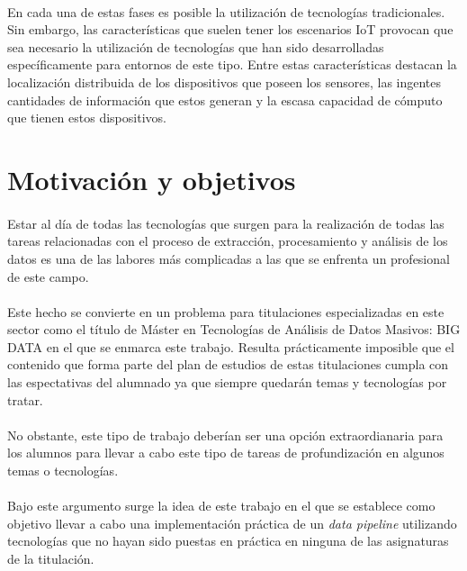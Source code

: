 \documentclass[12pt, a4paper]{article}
\begin{document}
        \paragraph{}
        En cada una de estas fases es posible la utilización de tecnologías tradicionales. Sin embargo, las características que suelen tener los escenarios IoT provocan que sea necesario la utilización de tecnologías que han sido desarrolladas específicamente para entornos de este tipo. Entre estas características destacan la localización distribuida de los dispositivos que poseen los sensores, las ingentes cantidades de información que estos generan y la escasa capacidad de cómputo que tienen estos dispositivos.


        \section{Motivación y objetivos}

        \paragraph{}
        Estar al día de todas las tecnologías que surgen para la realización de todas las tareas relacionadas con el proceso de extracción, procesamiento y análisis de los datos es una de las labores más complicadas a las que se enfrenta un profesional de este campo.

        \paragraph{}
        Este hecho se convierte en un problema para titulaciones especializadas en este sector como el título de Máster en Tecnologías de Análisis de Datos Masivos: BIG DATA en el que se enmarca este trabajo. Resulta prácticamente imposible que el contenido que forma parte del plan de estudios de estas titulaciones cumpla con las espectativas del alumnado ya que siempre quedarán temas y tecnologías por tratar.

        \paragraph{}
        No obstante, este tipo de trabajo deberían ser una opción extraordianaria para los alumnos para llevar a cabo este tipo de tareas de profundización en algunos temas o tecnologías.

        \paragraph{}
        Bajo este argumento surge la idea de este trabajo en el que se establece como objetivo llevar a cabo una implementación práctica de un \textit{data pipeline} utilizando tecnologías que no hayan sido puestas en práctica en ninguna de las asignaturas de la titulación.
\end{document}
